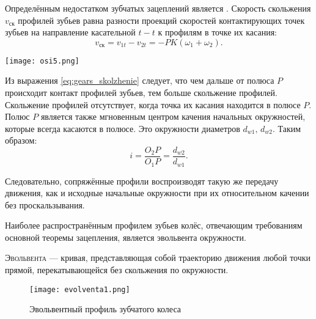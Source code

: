 Определённым недостатком зубчатых зацеплений является . Скорость скольжения $ v_\text{ск} $ профилей зубьев равна разности проекций скоростей контактирующих точек зубьев на направление касательной $ t-t $ к профилям в точке их касания: 
\begin{equation}
\label{eq:gears_skolzhenie}
v_\text{ск}=v_{1t} - v_{2t} = -PK (\omega_1 + \omega_2).
\end{equation}

\begin{marginfigure}
	\texttt{[image: osi5.png]}
\end{marginfigure}

Из выражения \ref{eq:gears_skolzhenie} следует, что чем дальше от полюса $ P $ происходит контакт профилей зубьев, тем больше скольжение профилей.
Скольжение профилей отсутствует, когда точка их касания находится в полюсе $ P $. 
Полюс $ P $ является также мгновенным центром качения начальных окружностей, которые всегда касаются в полюсе. Это окружности диаметров $ d_{w1}, \, d_{w2} $. 
Таким образом:
\begin{equation*}
i=\dfrac{O_2 P}{O_1 P} = \dfrac{d_{w2}}{d_{w1}}.
\end{equation*}

\noindent
Следовательно, сопряжённые профили воспроизводят такую же передачу движения, как и исходные начальные окружности при их относительном качении без проскальзывания.

Наиболее распространённым профилем зубьев колёс, отвечающим требованиям основной теоремы зацепления, является эвольвента окружности.

\noindent
\textsc{Эвольвента} --- кривая, представляющая собой траекторию движения любой точки прямой, перекатывающейся без скольжения по окружности.

\begin{figure}[h!]
	\texttt{[image: evolventa1.png]}
	\caption{Эвольвентный профиль зубчатого колеса}
	\label{pic:evolventa1}
\end{figure}

